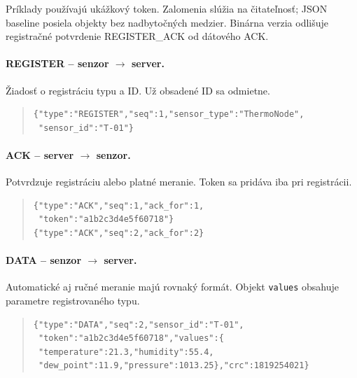 \documentclass[12pt,a4paper]{article}
\begin{document}
Príklady používajú ukážkový token. Zalomenia slúžia na čitateľnosť; JSON baseline posiela objekty bez nadbytočných medzier. Binárna verzia odlišuje registračné potvrdenie REGISTER\_ACK od dátového ACK.

\paragraph{REGISTER -- senzor $\rightarrow$ server.}
Žiadosť o registráciu typu a ID. Už obsadené ID sa odmietne.
\begin{quote}\begin{minipage}{\linewidth}\small\singlespacing
\begin{verbatim}
{"type":"REGISTER","seq":1,"sensor_type":"ThermoNode",
 "sensor_id":"T-01"}
\end{verbatim}
\end{minipage}\end{quote}

\paragraph{ACK -- server $\rightarrow$ senzor.}
Potvrdzuje registráciu alebo platné meranie. Token sa pridáva iba pri registrácii.
\begin{quote}\begin{minipage}{\linewidth}\small\singlespacing
\begin{verbatim}
{"type":"ACK","seq":1,"ack_for":1,
 "token":"a1b2c3d4e5f60718"}
{"type":"ACK","seq":2,"ack_for":2}
\end{verbatim}
\end{minipage}\end{quote}

\paragraph{DATA -- senzor $\rightarrow$ server.}
Automatické aj ručné meranie majú rovnaký formát. Objekt \texttt{values} obsahuje parametre registrovaného typu.
\begin{quote}\begin{minipage}{\linewidth}\small\singlespacing
\begin{verbatim}
{"type":"DATA","seq":2,"sensor_id":"T-01",
 "token":"a1b2c3d4e5f60718","values":{
 "temperature":21.3,"humidity":55.4,
 "dew_point":11.9,"pressure":1013.25},"crc":1819254021}
\end{verbatim}
\end{minipage}\end{quote}
\end{document}
